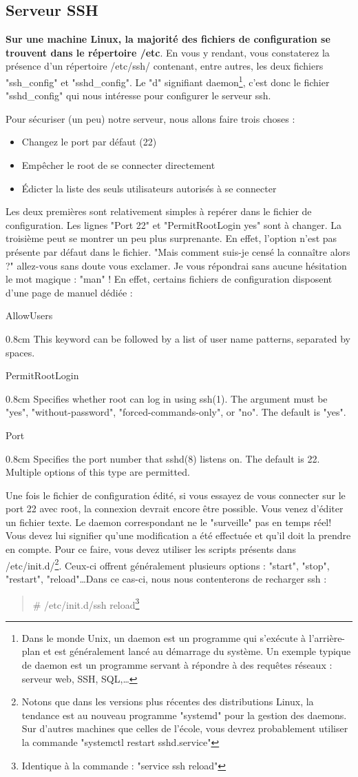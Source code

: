 \documentclass[a4paper,11pt]{article}
\newcommand{\commande}[1] {
    \begin{quote}
    \tt\raggedright #1
    \end{quote}
}
\newcommand{\man}[2]{
    \begin{tcolorbox}[toprule=3mm,width=\textwidth,outer arc=0mm,colbacktitle=grayman,coltitle=black,colback={grayman},colframe={grayman},title={man : \tt #1}]
        \tt\raggedright #2
    \end{tcolorbox}
}
\newcommand{\mandesc}[1]{
    \begin{adjustwidth}{0.8cm}{}
        #1
    \end{adjustwidth}
}
\begin{document}
\subsection{Serveur SSH}
\par \textbf{Sur une machine Linux, la majorité des fichiers de configuration se trouvent dans le répertoire /etc}. En vous y rendant, vous constaterez la présence d'un répertoire /etc/ssh/ contenant, entre autres, les deux fichiers "ssh\_config" et "sshd\_config". Le "d" signifiant daemon\footnote{Dans le monde Unix, un daemon est un programme qui s'exécute à l'arrière-plan et est généralement lancé au démarrage du système. Un exemple typique de daemon est un programme servant à répondre à des requêtes réseaux : serveur web, SSH, SQL,\dots }, c'est donc le fichier "sshd\_config" qui nous intéresse pour configurer le serveur ssh.
\par Pour sécuriser (un peu) notre serveur, nous allons faire trois choses :
\begin{itemize}
    \item Changez le port par défaut (22)
    \item Empêcher le root de se connecter directement
    \item Édicter la liste des seuls utilisateurs autorisés à se connecter
\end{itemize}
\par Les deux premières sont relativement simples à repérer dans le fichier de configuration. Les lignes "Port 22" et "PermitRootLogin yes" sont à changer. La troisième peut se montrer un peu plus surprenante. En effet, l'option n'est pas présente par défaut dans le fichier. "Mais comment suis-je censé la connaître alors ?" allez-vous sans doute vous exclamer. Je vous répondrai sans aucune hésitation le mot magique : "man" ! En effet, certains fichiers de configuration disposent d'une page de manuel dédiée :
\man{sshd\_config}{
AllowUsers
\mandesc{This keyword can be followed by a list of user name patterns, separated by spaces.}
PermitRootLogin
\mandesc{Specifies whether root can log in using ssh(1).  The argument must be "yes", "without-password", "forced-commands-only", or "no". The default is "yes".}
Port
\mandesc{Specifies the port number that sshd(8) listens on.  The default is 22.  Multiple options of this type are permitted.}
}
\par Une fois le fichier de configuration édité, si vous essayez de vous connecter sur le port 22 avec root, la connexion devrait encore être possible. Vous venez d'éditer un fichier texte. Le daemon correspondant ne le "surveille" pas en temps réel! Vous devez lui signifier qu'une modification a été effectuée et qu'il doit la prendre en compte. Pour ce faire, vous devez utiliser les scripts présents dans /etc/init.d/\footnote{Notons que dans les versions plus récentes des distributions Linux, la tendance est au nouveau programme "systemd" pour la gestion des daemons. Sur d'autres machines que celles de l'école, vous devrez probablement utiliser la commande "systemctl restart sshd.service"}. Ceux-ci offrent généralement plusieurs options : "start", "stop", "restart", "reload"\ldots Dans ce cas-ci, nous nous contenterons de recharger ssh :
\commande{\# /etc/init.d/ssh reload\footnote{Identique à la commande : "service ssh reload"}}
\end{document}
